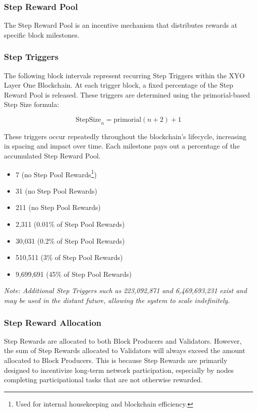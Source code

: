 \documentclass{article}
\begin{document}
\subsubsection{Step Reward Pool}
The Step Reward Pool is an incentive mechanism that distributes rewards at specific block milestones.

\subsubsection{Step Triggers}

The following block intervals represent recurring Step Triggers within the XYO Layer One Blockchain. At each trigger block, a fixed percentage of the Step Reward Pool is released. These triggers are determined using the primorial-based Step Size formula:

\[
\text{StepSize}_n = \text{primorial}(n + 2) + 1
\]

These triggers occur repeatedly throughout the blockchain's lifecycle, increasing in spacing and impact over time. Each milestone pays out a percentage of the accumulated Step Reward Pool.

\begin{itemize}
    \item 7 (no Step Pool Rewards\footnote{Used for internal housekeeping and blockchain efficiency.})
    \item 31 (no Step Pool Rewards)
    \item 211 (no Step Pool Rewards)
    \item 2,311 (0.01\% of Step Pool Rewards)
    \item 30,031 (0.2\% of Step Pool Rewards)
    \item 510,511 (3\% of Step Pool Rewards)
    \item 9,699,691 (45\% of Step Pool Rewards)
\end{itemize}

\noindent
\textit{Note: Additional Step Triggers such as 223,092,871 and 6,469,693,231 exist and may be used in the distant future, allowing the system to scale indefinitely.}

\subsubsection{Step Reward Allocation}
Step Rewards are allocated to both Block Producers and Validators. However, the sum of Step Rewards allocated to Validators will always exceed the amount allocated to Block Producers. This is because Step Rewards are primarily designed to incentivize long-term network participation, especially by nodes completing participational tasks that are not otherwise rewarded. 
\end{document}
